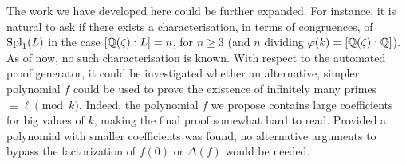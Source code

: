 \documentclass[../main.tex]{subfiles}
\begin{document}
The work we have developed here could be further expanded. For instance, it is natural to ask if there exists a characterisation, in terms of congruences, of $\operatorname{Spl}_1(L)$ in the case $[\mathbb{Q}(\zeta):L]=n$, for $n\geqslant 3$ (and $n$ dividing $\varphi(k)=[\mathbb{Q}(\zeta):\mathbb{Q}]$). As of now, no such characterisation is known. With respect to the automated proof generator, it could be investigated whether an alternative, simpler polynomial $f$ could be used to prove the existence of infinitely many primes $\equiv\ell\pmod{k}$. Indeed, the polynomial $f$ we propose contains large coefficients for big values of $k$, making the final proof somewhat hard to read. Provided a polynomial with smaller coefficients was found, no alternative arguments to bypass the factorization of $f(0)$ or $\Delta(f)$ would be needed.
\end{document}
